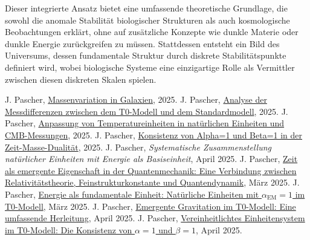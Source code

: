 \documentclass[12pt,a4paper]{article}
\newcommand{\alphaEM}{\alpha_{\text{EM}}}
\begin{document}
	Dieser integrierte Ansatz bietet eine umfassende theoretische Grundlage, die sowohl die anomale Stabilität biologischer Strukturen als auch kosmologische Beobachtungen erklärt, ohne auf zusätzliche Konzepte wie dunkle Materie oder dunkle Energie zurückgreifen zu müssen. Stattdessen entsteht ein Bild des Universums, dessen fundamentale Struktur durch diskrete Stabilitäts\-punkte definiert wird, wobei biologische Systeme eine einzigartige Rolle als Vermittler zwischen diesen diskreten Skalen spielen.
	
	
	\begin{thebibliography}{99}
		 J. Pascher, \href{https://github.com/jpascher/T0-Time-Mass-Duality/blob/main/2/pdf/Deutsch/MassVarGalaxien.pdf}{Massenvariation in Galaxien}, 2025.
		 J. Pascher, \href{https://github.com/jpascher/T0-Time-Mass-Duality/blob/main/2/pdf/Deutsch/MessdifferenzenT0Standard.pdf}{Analyse der Messdifferenzen zwischen dem T0-Modell und dem Standardmodell}, 2025.
		 J. Pascher, \href{https://github.com/jpascher/T0-Time-Mass-Duality/blob/main/2/pdf/Deutsch/TempEinheitenCMB.pdf}{Anpassung von Temperatureinheiten in natürlichen Einheiten und CMB-Messungen}, 2025.
		 J. Pascher, \href{https://github.com/jpascher/T0-Time-Mass-Duality/blob/main/2/pdf/Deutsch/Alpha1Beta1Konsistenz.pdf}{Konsistenz von Alpha=1 und Beta=1 in der Zeit-Masse-Dualität}, 2025.
		 J. Pascher, \textit{Systematische Zusammenstellung natürlicher Einheiten mit Energie als Basiseinheit}, April 2025.
		 J. Pascher, \href{https://github.com/jpascher/T0-Time-Mass-Duality/tree/main/2/pdf/Deutsch/ZeitEmergentQM.pdf}{Zeit als emergente Eigenschaft in der Quantenmechanik: Eine Verbindung zwischen Relativitätstheorie, Feinstrukturkonstante und Quantendynamik}, März 2025.
		 J. Pascher, \href{https://github.com/jpascher/T0-Time-Mass-Duality/tree/main/2/pdf/Deutsch/NatEinheitenAlpha1.pdf}{Energie als fundamentale Einheit: Natürliche Einheiten mit $\alphaEM = 1$ im T0-Modell}, März 2025.
		 J. Pascher, \href{https://github.com/jpascher/T0-Time-Mass-Duality/tree/main/2/pdf/Deutsch/EmergentGravT0.pdf}{Emergente Gravitation im T0-Modell: Eine umfassende Herleitung}, April 2025.
		 J. Pascher, \href{https://github.com/jpascher/T0-Time-Mass-Duality/tree/main/2/pdf/Deutsch/Alpha1Beta1Konsistenz.pdf}{Vereinheitlichtes Einheitensystem im T0-Modell: Die Konsistenz von $\alpha = 1$ und $\beta = 1$}, April 2025.

\end{thebibliography}
\end{document}
